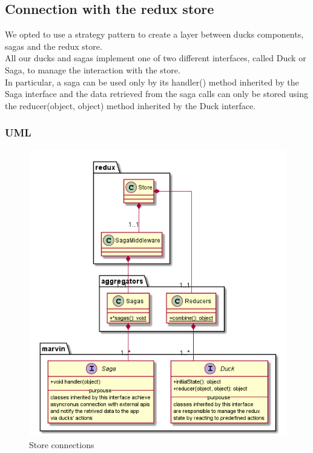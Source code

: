 
	\subsection{Connection with the redux store}
	We opted to use a strategy pattern to create a layer between ducks components, sagas and the redux store.\\
	All our ducks and sagas implement one of two different interfaces, called Duck or Saga, to manage the interaction with the store.\\
	In particular, a saga can be used only by its handler() method inherited by the Saga interface
	and the data retrieved from the saga calls can only be stored using the reducer(object, object) method inherited by the Duck interface.
	\subsubsection{UML}
	\begin{figure}[H]
		\centering
		\includegraphics[width=0.5\linewidth]{"diagrammi/redux/store connection"}
		\caption{Store connections}
		\label{fig:Store connections}
	\end{figure}
	
